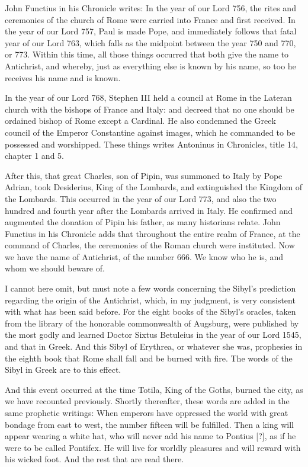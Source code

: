 John Functius in his Chronicle writes: In the year of our Lord 756, the rites and ceremonies of the church of Rome were carried into France and first received. In the year of our Lord 757, Paul is made Pope, and immediately follows that fatal year of our Lord 763, which falls as the midpoint between the year 750 and 770, or 773. Within this time, all those things occurred that both give the name to Antichrist, and whereby, just as everything else is known by his name, so too he receives his name and is known.

In the year of our Lord 768, Stephen III held a council at Rome in the Lateran church with the bishops of France and Italy: and decreed that no one should be ordained bishop of Rome except a Cardinal. He also condemned the Greek council of the Emperor Constantine against images, which he commanded to be possessed and worshipped. These things writes Antoninus in Chronicles, title 14, chapter 1 and 5.

After this, that great Charles, son of Pipin, was summoned to Italy by Pope Adrian, took Desiderius, King of the Lombards, and extinguished the Kingdom of the Lombards. This occurred in the year of our Lord 773, and also the two hundred and fourth year after the Lombards arrived in Italy. He confirmed and augmented the donation of Pipin his father, as many historians relate. John Functius in his Chronicle adds that throughout the entire realm of France, at the command of Charles, the ceremonies of the Roman church were instituted. Now we have the name of Antichrist, of the number 666. We know who he is, and whom we should beware of.

I cannot here omit, but must note a few words concerning the Sibyl’s prediction regarding the origin of the Antichrist, which, in my judgment, is very consistent with what has been said before. For the eight books of the Sibyl’s oracles, taken from the library of the honorable commonwealth of Augsburg, were published by the most godly and learned Doctor Sixtus Betuleius in the year of our Lord 1545, and that in Greek. And this Sibyl of Erythrea, or whatever she was, prophesies in the eighth book that Rome shall fall and be burned with fire. The words of the Sibyl in Greek are to this effect.

And this event occurred at the time Totila, King of the Goths, burned the city, as we have recounted previously. Shortly thereafter, these words are added in the same prophetic writings: When emperors have oppressed the world with great bondage from east to west, the number fifteen will be fulfilled. Then a king will appear wearing a white hat, who will never add his name to Pontius [?], as if he were to be called Pontifex. He will live for worldly pleasures and will reward with his wicked foot. And the rest that are read there.

